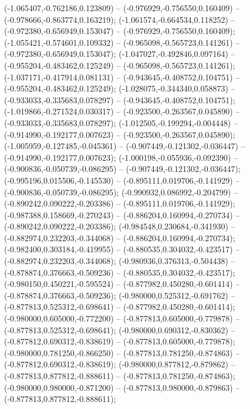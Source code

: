  (-1.065407,-0.762186,0.123809) -- (-0.976929,-0.756550,0.160409) -- (-0.978666,-0.863774,0.163219);
 (-1.061574,-0.664534,0.118252) -- (-0.972380,-0.656949,0.153047) -- (-0.976929,-0.756550,0.160409);
 (-1.055421,-0.574601,0.109332) -- (-0.965098,-0.565723,0.141261) -- (-0.972380,-0.656949,0.153047);
 (-1.047027,-0.492846,0.097164) -- (-0.955204,-0.483462,0.125249) -- (-0.965098,-0.565723,0.141261);
 (-1.037171,-0.417914,0.081131) -- (-0.943645,-0.408752,0.104751) -- (-0.955204,-0.483462,0.125249);
 (-1.028075,-0.344340,0.058873) -- (-0.933033,-0.335683,0.078297) -- (-0.943645,-0.408752,0.104751);
 (-1.019866,-0.271524,0.030317) -- (-0.923500,-0.263567,0.045890) -- (-0.933033,-0.335683,0.078297);
 (-1.012505,-0.199294,-0.004448) -- (-0.914990,-0.192177,0.007623) -- (-0.923500,-0.263567,0.045890);
 (-1.005959,-0.127485,-0.045361) -- (-0.907449,-0.121302,-0.036447) -- (-0.914990,-0.192177,0.007623);
 (-1.000198,-0.055936,-0.092390) -- (-0.900836,-0.050739,-0.086295) -- (-0.907449,-0.121302,-0.036447);
 (-0.995196,0.015506,-0.145530) -- (-0.895111,0.019706,-0.141929) -- (-0.900836,-0.050739,-0.086295);
 (-0.990932,0.086992,-0.204799) -- (-0.890242,0.090222,-0.203386) -- (-0.895111,0.019706,-0.141929);
 (-0.987388,0.158669,-0.270243) -- (-0.886204,0.160994,-0.270734) -- (-0.890242,0.090222,-0.203386);
 (-0.984548,0.230684,-0.341930) -- (-0.882974,0.232203,-0.344068) -- (-0.886204,0.160994,-0.270734);
 (-0.982400,0.303184,-0.419955) -- (-0.880535,0.304032,-0.423517) -- (-0.882974,0.232203,-0.344068);
 (-0.980936,0.376313,-0.504438) -- (-0.878874,0.376663,-0.509236) -- (-0.880535,0.304032,-0.423517);
 (-0.980150,0.450221,-0.595524) -- (-0.877982,0.450280,-0.601414) -- (-0.878874,0.376663,-0.509236);
 (-0.980000,0.525312,-0.691762) -- (-0.877813,0.525312,-0.698641) -- (-0.877982,0.450280,-0.601414);
 (-0.980000,0.605000,-0.772200) -- (-0.877813,0.605000,-0.779878) -- (-0.877813,0.525312,-0.698641);
 (-0.980000,0.690312,-0.830362) -- (-0.877812,0.690312,-0.838619) -- (-0.877813,0.605000,-0.779878);
 (-0.980000,0.781250,-0.866250) -- (-0.877813,0.781250,-0.874863) -- (-0.877812,0.690312,-0.838619);
 (-0.980000,0.877812,-0.879862) -- (-0.877813,0.877812,-0.888611) -- (-0.877813,0.781250,-0.874863);
 (-0.980000,0.980000,-0.871200) -- (-0.877813,0.980000,-0.879863) -- (-0.877813,0.877812,-0.888611);
